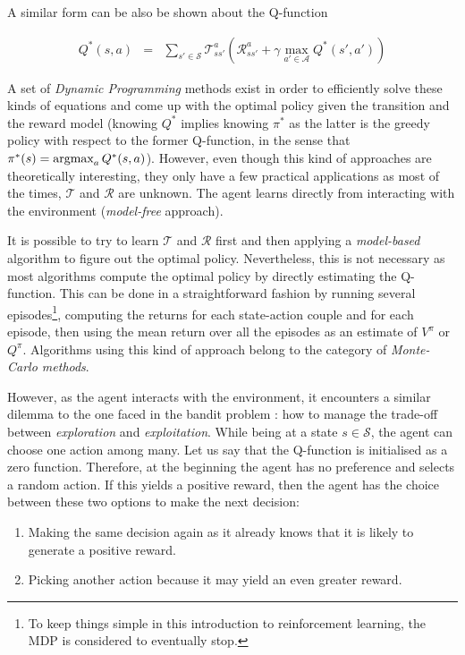			A similar form can be also be shown about the Q-function
							
				\begin{eqnarray}
					Q^*(s,a) & = & \sum_{s' \in \mathcal{S}} \mathscr{T}_{ss'}^a (\mathscr{R}_{ss'}^a + \gamma \max_{a' \in \mathcal{A}} Q^*(s',a')) \label{eq:qbellmanoptim}
				\end{eqnarray}

			A set of \textit{Dynamic Programming} methods exist in order to efficiently solve these kinds of equations and come up with the optimal policy given the transition and the reward model (knowing $Q^*$ implies knowing $\pi^*$ as the latter is the greedy policy with respect to the former Q-function, in the sense that $\pi^*(s) = \mathop{\hbox{argmax}}_a Q^*(s,a)$). However, even though this kind of approaches are theoretically interesting, they only have a few practical applications as most of the times, $\mathscr{T}$ and $\mathscr{R}$ are unknown. The agent learns directly from interacting with the environment (\textit{model-free} approach).
			
			It is possible to try to learn $\mathscr{T}$ and $\mathscr{R}$ first and then applying a \textit{model-based} algorithm to figure out the optimal policy. Nevertheless, this is not necessary as most algorithms compute the optimal policy by directly estimating the Q-function. This can be done in a straightforward fashion by running several episodes\footnote{To keep things simple in this introduction to reinforcement learning, the MDP is considered to eventually stop.}, computing the returns for each state-action couple and for each episode, then using the mean return over all the episodes as an estimate of $V^\pi$ or $Q^\pi$. Algorithms using this kind of approach belong to the category of \textit{Monte-Carlo methods}.
			
			However, as the agent interacts with the environment, it encounters a similar dilemma to the one faced in the bandit problem \cite{Berry1985,Bubeck2012}: how to manage the trade-off between \textit{exploration} and \textit{exploitation}. While being at a state $s \in \mathcal{S}$, the agent can choose one action among many. Let us say that the Q-function is initialised as a zero function. Therefore, at the beginning the agent has no preference and selects a random action. If this yields a positive reward, then the agent has the choice between these two options to make the next decision:
			
			\begin{enumerate}
				\item Making the same decision again as it already knows that it is likely to generate a positive reward.
				\item Picking another action because it may yield an even greater reward.
			\end{enumerate}
			
